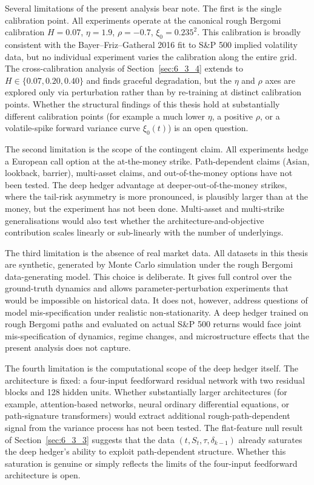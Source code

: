 \documentclass[12pt,a4paper]{article}
\theoremstyle{definition}
\theoremstyle{plain}
\theoremstyle{remark}
\theoremstyle{plain}
\begin{document}
Several limitations of the present analysis bear note. The first is
the single calibration point. All experiments operate at the
canonical rough Bergomi calibration $H = 0.07$, $\eta = 1.9$,
$\rho = -0.7$, $\xi_0 = 0.235^2$. This calibration is broadly
consistent with the Bayer--Friz--Gatheral 2016 fit to S\&P 500
implied volatility data, but no individual experiment varies the
calibration along the entire grid. The cross-calibration analysis of
Section~\ref{sec:6_3_4} extends to $H \in \{0.07, 0.20, 0.40\}$ and
finds graceful degradation, but the $\eta$ and $\rho$ axes are
explored only via perturbation rather than by re-training at distinct
calibration points. Whether the structural findings of this thesis
hold at substantially different calibration points (for example a
much lower $\eta$, a positive $\rho$, or a volatile-spike forward
variance curve $\xi_0(t)$) is an open question.

The second limitation is the scope of the contingent claim. All
experiments hedge a European call option at the at-the-money strike.
Path-dependent claims (Asian, lookback, barrier), multi-asset
claims, and out-of-the-money options have not been tested. The deep
hedger advantage at deeper-out-of-the-money strikes, where the
tail-risk asymmetry is more pronounced, is plausibly larger than at
the money, but the experiment has not been done. Multi-asset and
multi-strike generalisations would also test whether the
architecture-and-objective contribution scales linearly or
sub-linearly with the number of underlyings.

The third limitation is the absence of real market data. All
datasets in this thesis are synthetic, generated by Monte Carlo
simulation under the rough Bergomi data-generating model. This
choice is deliberate. It gives full control over the ground-truth
dynamics and allows parameter-perturbation experiments that would
be impossible on historical data. It does not, however, address
questions of model mis-specification under realistic
non-stationarity. A deep hedger trained on rough Bergomi paths and
evaluated on actual S\&P 500 returns would face joint
mis-specification of dynamics, regime changes, and microstructure
effects that the present analysis does not capture.

The fourth limitation is the computational scope of the deep hedger
itself. The architecture is fixed: a four-input feedforward residual
network with two residual blocks and 128 hidden units. Whether
substantially larger architectures (for example, attention-based
networks, neural ordinary differential equations, or path-signature
transformers) would extract additional rough-path-dependent signal
from the variance process has not been tested. The flat-feature null
result of Section~\ref{sec:6_3_3} suggests that the data
$(t, S_t, \tau, \delta_{k-1})$ already saturates the deep hedger's
ability to exploit path-dependent structure. Whether this saturation
is genuine or simply reflects the limits of the four-input
feedforward architecture is open.
\end{document}
